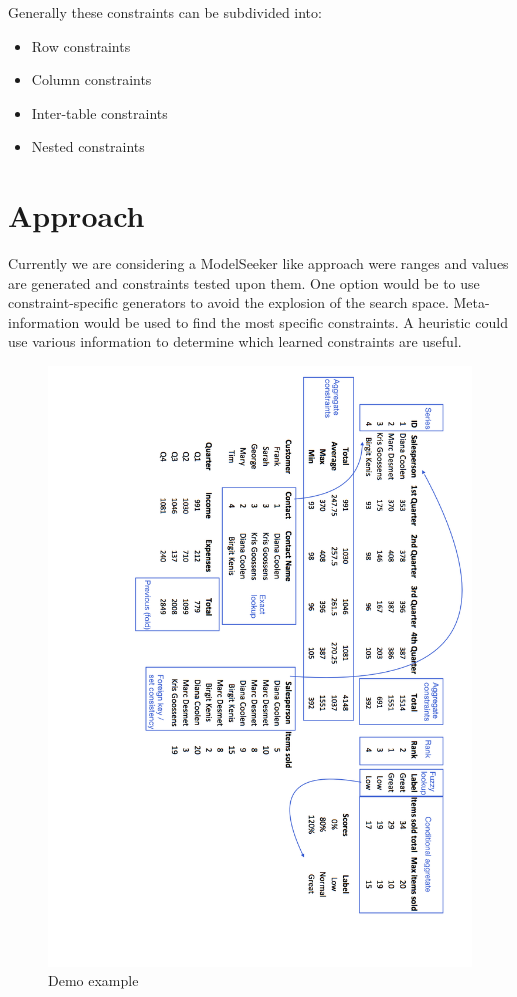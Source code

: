 \documentclass[a4paper]{article}
\begin{document}
Generally these constraints can be subdivided into:

\begin{itemize}
	\item Row constraints
	\item Column constraints
	\item Inter-table constraints
	\item Nested constraints
\end{itemize}


\section{Approach} %
\label{sec:approach}

Currently we are considering a ModelSeeker like approach were ranges and values are generated and constraints tested upon them.
One option would be to use constraint-specific generators to avoid the explosion of the search space.
Meta-information would be used to find the most specific constraints.
A heuristic could use various information to determine which learned constraints are useful.


\begin{figure}
  \centering
    \includegraphics[width=1\linewidth]{../Demo.png}
  \caption{Demo example}
  \label{fig:demo}
\end{figure}
\end{document}
